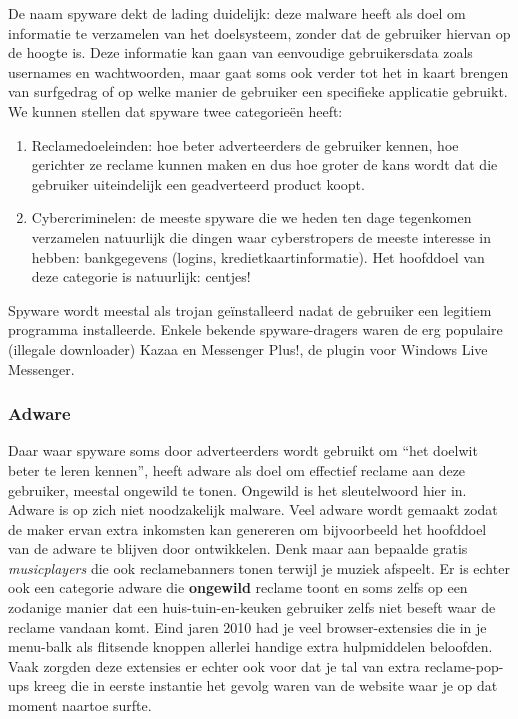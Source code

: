 \documentclass[
  10pt,
  dutch,
  paper=a4,
  ,captions=tableheading
]{scrbook}
\providecommand{\tightlist}{%
  \setlength{\itemsep}{0pt}\setlength{\parskip}{0pt}}
\begin{document}
De naam spyware dekt de lading duidelijk: deze malware heeft als doel om
informatie te verzamelen van het doelsysteem, zonder dat de gebruiker
hiervan op de hoogte is. Deze informatie kan gaan van eenvoudige
gebruikersdata zoals usernames en wachtwoorden, maar gaat soms ook
verder tot het in kaart brengen van surfgedrag of op welke manier de
gebruiker een specifieke applicatie gebruikt. We kunnen stellen dat
spyware twee categorieën heeft:

\begin{enumerate}
\def\labelenumi{\arabic{enumi}.}
\tightlist
\item
  Reclamedoeleinden: hoe beter adverteerders de gebruiker kennen, hoe
  gerichter ze reclame kunnen maken en dus hoe groter de kans wordt dat
  die gebruiker uiteindelijk een geadverteerd product koopt.
\item
  Cybercriminelen: de meeste spyware die we heden ten dage tegenkomen
  verzamelen natuurlijk die dingen waar cyberstropers de meeste
  interesse in hebben: bankgegevens (logins, kredietkaartinformatie).
  Het hoofddoel van deze categorie is natuurlijk: centjes!
\end{enumerate}

Spyware wordt meestal als trojan geïnstalleerd nadat de gebruiker een
legitiem programma installeerde. Enkele bekende spyware-dragers waren de
erg populaire (illegale downloader) Kazaa en Messenger Plus!, de plugin
voor Windows Live Messenger.

\subsubsection{Adware}\label{adware}

Daar waar spyware soms door adverteerders wordt gebruikt om ``het
doelwit beter te leren kennen'', heeft adware als doel om effectief
reclame aan deze gebruiker, meestal ongewild te tonen. Ongewild is het
sleutelwoord hier in. Adware is op zich niet noodzakelijk malware. Veel
adware wordt gemaakt zodat de maker ervan extra inkomsten kan genereren
om bijvoorbeeld het hoofddoel van de adware te blijven door ontwikkelen.
Denk maar aan bepaalde gratis \emph{musicplayers} die ook reclamebanners
tonen terwijl je muziek afspeelt. Er is echter ook een categorie adware
die \textbf{ongewild} reclame toont en soms zelfs op een zodanige manier
dat een huis-tuin-en-keuken gebruiker zelfs niet beseft waar de reclame
vandaan komt. Eind jaren 2010 had je veel browser-extensies die in je
menu-balk als flitsende knoppen allerlei handige extra hulpmiddelen
beloofden. Vaak zorgden deze extensies er echter ook voor dat je tal van
extra reclame-pop-ups kreeg die in eerste instantie het gevolg waren van
de website waar je op dat moment naartoe surfte.
\end{document}
